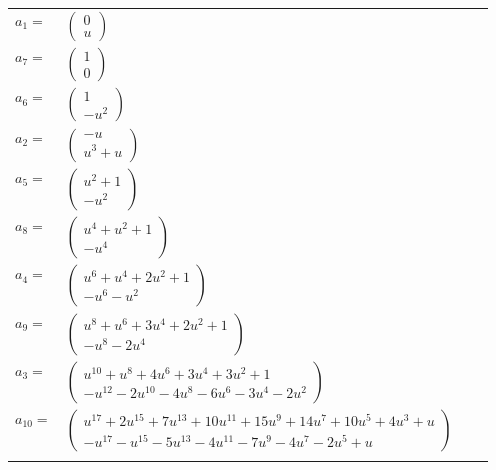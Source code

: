 \documentclass[1p]{elsarticle_modified}
\theoremstyle{definition}
\begin{document}
\begin{tabular}{m{7pt} m{180pt} m{7pt} m{180pt} }
\flushright $a_{1}=$&$\begin{pmatrix}0\\u\end{pmatrix}$ \\
\flushright $a_{7}=$&$\begin{pmatrix}1\\0\end{pmatrix}$ \\
\flushright $a_{6}=$&$\begin{pmatrix}1\\- u^2\end{pmatrix}$ \\
\flushright $a_{2}=$&$\begin{pmatrix}- u\\u^3+u\end{pmatrix}$ \\
\flushright $a_{5}=$&$\begin{pmatrix}u^2+1\\- u^2\end{pmatrix}$ \\
\flushright $a_{8}=$&$\begin{pmatrix}u^4+u^2+1\\- u^4\end{pmatrix}$ \\
\flushright $a_{4}=$&$\begin{pmatrix}u^6+u^4+2 u^2+1\\- u^6- u^2\end{pmatrix}$ \\
\flushright $a_{9}=$&$\begin{pmatrix}u^8+u^6+3 u^4+2 u^2+1\\- u^8-2 u^4\end{pmatrix}$ \\
\flushright $a_{3}=$&$\begin{pmatrix}u^{10}+u^8+4 u^6+3 u^4+3 u^2+1\\- u^{12}-2 u^{10}-4 u^8-6 u^6-3 u^4-2 u^2\end{pmatrix}$ \\
\flushright $a_{10}=$&$\begin{pmatrix}u^{17}+2 u^{15}+7 u^{13}+10 u^{11}+15 u^9+14 u^7+10 u^5+4 u^3+u\\- u^{17}- u^{15}-5 u^{13}-4 u^{11}-7 u^9-4 u^7-2 u^5+u\end{pmatrix}$\\&\end{tabular}
\end{document}
